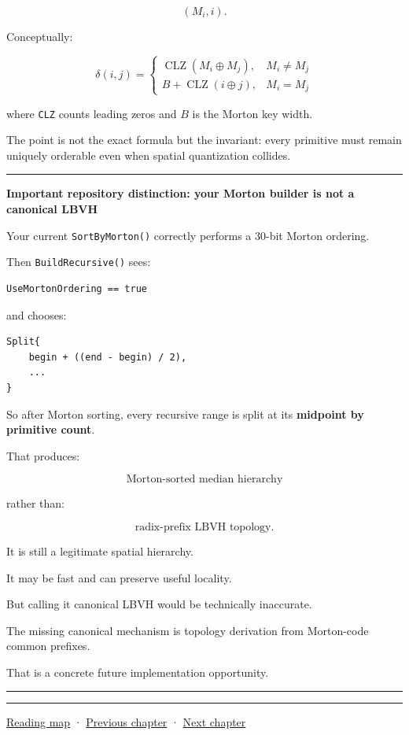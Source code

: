 \[
(M_i,i).
\]

Conceptually:

\[
\delta(i,j)
=
\begin{cases}
\operatorname{CLZ}(M_i\oplus M_j), & M_i\ne M_j\\
B+\operatorname{CLZ}(i\oplus j), & M_i=M_j
\end{cases}
\]

where \texttt{CLZ} counts leading zeros and \(B\) is the Morton key width.

The point is not the exact formula but the invariant: every primitive must remain uniquely orderable even when spatial quantization collides.

\begin{center}\rule{0.5\linewidth}{0.5pt}\end{center}

\textbf{Important repository distinction: your Morton builder is not a canonical LBVH}

Your current \texttt{SortByMorton()} correctly performs a 30-bit Morton ordering.

Then \texttt{BuildRecursive()} sees:

\begin{verbatim}
UseMortonOrdering == true
\end{verbatim}

and chooses:

\begin{verbatim}
Split{
    begin + ((end - begin) / 2),
    ...
}
\end{verbatim}

So after Morton sorting, every recursive range is split at its \textbf{midpoint by primitive count}.

That produces:

\[
\boxed{\text{Morton-sorted median hierarchy}}
\]

rather than:

\[
\boxed{\text{radix-prefix LBVH topology}}.
\]

It is still a legitimate spatial hierarchy.

It may be fast and can preserve useful locality.

But calling it canonical LBVH would be technically inaccurate.

The missing canonical mechanism is topology derivation from Morton-code common prefixes.

That is a concrete future implementation opportunity.

\begin{center}\rule{0.5\linewidth}{0.5pt}\end{center}

\begin{center}\rule{0.5\linewidth}{0.5pt}\end{center}

\hyperref[volume-reading-map]{Reading map} · \hyperref[06-engine-ii-ch026]{Previous chapter} · \hyperref[06-engine-ii-ch028]{Next chapter}
